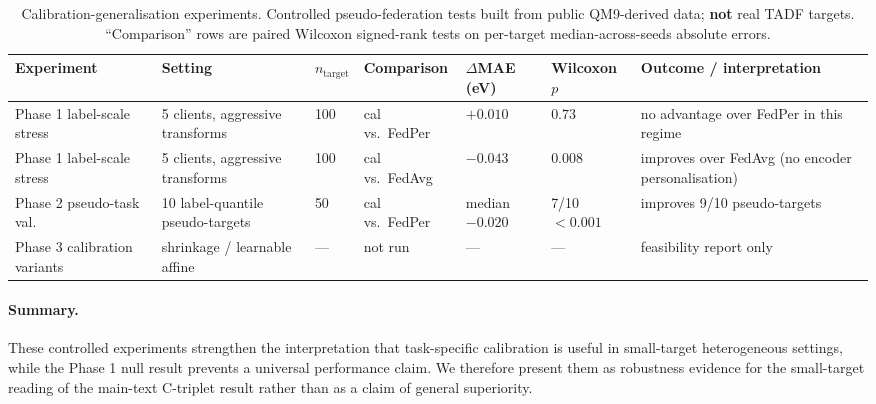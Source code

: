 \documentclass[11pt,a4paper]{article}
\begin{document}
\begin{table}[ht]
\centering\small
\caption{Calibration-generalisation experiments. Controlled pseudo-federation tests built from public QM9-derived data; \textbf{not} real TADF targets. ``Comparison'' rows are paired Wilcoxon signed-rank tests on per-target median-across-seeds absolute errors.}\label{tab:calgen}
\begin{tabular}{lllllll}
\toprule
Experiment & Setting & $n_{\mathrm{target}}$ & Comparison & $\Delta$MAE (eV) & Wilcoxon $p$ & Outcome / interpretation \\
\midrule
Phase 1 label-scale stress  & 5 clients, aggressive transforms & 100 & cal vs.\ FedPer    & $+0.010$ & $0.73$  & no advantage over FedPer in this regime \\
Phase 1 label-scale stress  & 5 clients, aggressive transforms & 100 & cal vs.\ FedAvg    & $-0.043$ & $0.008$ & improves over FedAvg (no encoder personalisation) \\
Phase 2 pseudo-task val.    & 10 label-quantile pseudo-targets  &  50 & cal vs.\ FedPer    & median $-0.020$ & 7/10 $< 0.001$ & improves 9/10 pseudo-targets \\
Phase 3 calibration variants & shrinkage / learnable affine     & --- & not run            & ---      & ---     & feasibility report only \\
\bottomrule
\end{tabular}
\end{table}

\paragraph{Summary.}
These controlled experiments strengthen the interpretation that task-specific calibration is useful in small-target heterogeneous settings, while the Phase 1 null result prevents a universal performance claim. We therefore present them as robustness evidence for the small-target reading of the main-text C-triplet result rather than as a claim of general superiority.


\end{document}
